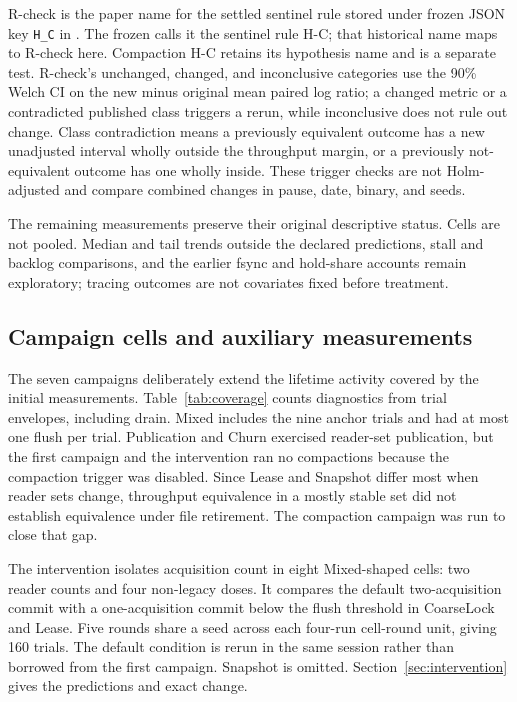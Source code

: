 R-check is the paper name for the settled sentinel rule stored under frozen JSON key \texttt{H\_C} in . The frozen  calls it the sentinel rule H-C; that historical name maps to R-check here. Compaction H-C retains its hypothesis name and is a separate test. R-check's unchanged, changed, and inconclusive categories use the 90\% Welch CI on the new minus original mean paired log ratio; a changed metric or a contradicted published class triggers a rerun, while inconclusive does not rule out change. Class contradiction means a previously equivalent outcome has a new unadjusted interval wholly outside the throughput margin, or a previously not-equivalent outcome has one wholly inside. These trigger checks are not Holm-adjusted and compare combined changes in pause, date, binary, and seeds.

The remaining measurements preserve their original descriptive status. Cells are not pooled. Median and tail trends outside the declared predictions, stall and backlog comparisons, and the earlier fsync and hold-share accounts remain exploratory; tracing outcomes are not covariates fixed before treatment.

\subsection{Campaign cells and auxiliary measurements}
The seven campaigns deliberately extend the lifetime activity covered by the initial measurements. Table~\ref{tab:coverage} counts diagnostics from trial envelopes, including drain. Mixed includes the nine anchor trials and had at most one flush per trial. Publication and Churn exercised reader-set publication, but the first campaign and the intervention ran no compactions because the compaction trigger was disabled. Since Lease and Snapshot differ most when reader sets change, throughput equivalence in a mostly stable set did not establish equivalence under file retirement. The compaction campaign was run to close that gap.

The intervention isolates acquisition count in eight Mixed-shaped cells: two reader counts and four non-legacy doses. It compares the default two-acquisition commit with a one-acquisition commit below the flush threshold in CoarseLock and Lease. Five rounds share a seed across each four-run cell-round unit, giving 160 trials. The default condition is rerun in the same session rather than borrowed from the first campaign. Snapshot is omitted. Section~\ref{sec:intervention} gives the predictions and exact change.

